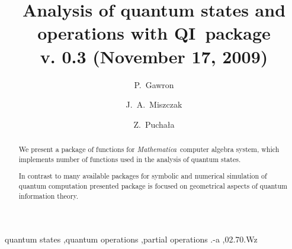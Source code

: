 \documentclass[final,5p,times]{elsarticle}
\newcommand{\Mathematica}{\emph{Mathematica}}
\newcommand{\1}{{\rm 1\hspace{-0.9mm}l}}
\newcommand{\qi}{QI}
\begin{document}
\begin{frontmatter}



\title{Analysis of quantum states and operations with \qi\ package\\[6pt] \small{v. 0.3 (November 17, 2009)}}


\author{P.~Gawron}
\author{J.~A.~Miszczak}
\author{Z.~Pucha{\l}a}
\address{Institute of Theoretical and Applied Informatics, Polish Academy of 
Sciences, Ba{\l}tycka 5, 44-100 Gliwice, Poland}

\begin{abstract}
We present a package of functions for \Mathematica\ computer algebra system, 
which implements number of functions used in the analysis of quantum states.

In contrast to many available packages for symbolic and numerical simulation of
quantum computation presented package is focused on geometrical aspects of 
quantum information theory.

\end{abstract}

\begin{keyword}
quantum states \sep quantum operations \sep partial operations
.-a \sep 02.70.Wz


\end{keyword}

\end{frontmatter}
\end{document}

